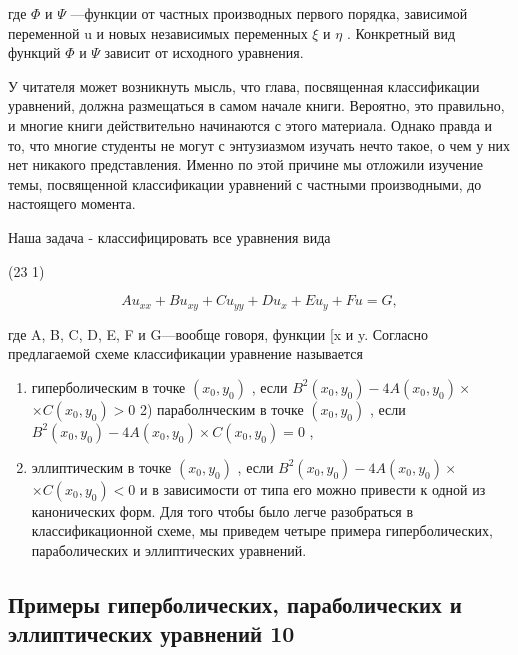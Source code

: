 \documentclass[
  ukrainian,
]{article}
\begin{document}
где \(\Phi\) и \(\Psi\) ---функции от частных производных первого
порядка, зависимой переменной u и новых независимых переменных \(\xi\) и
\(\eta\) . Конкретный вид функций \(\Phi\) и \(\Psi\) зависит от
исходного уравнения.

У читателя может возникнуть мысль, что глава, посвященная классификации
уравнений, должна размещаться в самом начале книги. Вероятно, это
правильно, и многие книги действительно начинаются с этого материала.
Однако правда и то, что многие студенты не могут с энтузиазмом изучать
нечто такое, о чем у них нет никакого представления. Именно по этой
причине мы отложили изучение темы, посвященной классификации уравнений с
частными производными, до настоящего момента.

Наша задача - классифицировать все уравнения вида

(23 1)

\[
Au_{xx} + Bu_{xy} + Cu_{yy} + Du_x + Eu_y + Fu = G,
\]

где A, B, C, D, E, F и G---вообще говоря, функции {[}x и y. Согласно
предлагаемой схеме классификации уравнение называется

\begin{enumerate}
\def\labelenumi{\arabic{enumi})}
\item
  гиперболическим в точке \((x_0, y_0)\) , если
  \(B^2(x_0, y_0) - 4A(x_0, y_0) \times\) \(\times C(x_0, y_0) > 0\) 2)
  параболнческим в точке \((x_0, y_0)\) , если
  \(B^2(x_0, y_0) - 4A(x_0, y_0) \times C(x_0, y_0) = 0\) ,
\item
  эллиптическим в точке \((x_0, y_0)\) , если
  \(B^2(x_0, y_0) - 4A(x_0, y_0) \times\) \(\times C(x_0, y_0) < 0\) и в
  зависимости от типа его можно привести к одной из канонических форм.
  Для того чтобы было легче разобраться в классификационной схеме, мы
  приведем четыре примера гиперболических, параболических и
  эллиптических уравнений.
\end{enumerate}

\subsection{Примеры гиперболических, параболических и эллиптических
уравнений
10}\label{ux43fux440ux438ux43cux435ux440ux44b-ux433ux438ux43fux435ux440ux431ux43eux43bux438ux447ux435ux441ux43aux438ux445-ux43fux430ux440ux430ux431ux43eux43bux438ux447ux435ux441ux43aux438ux445-ux438-ux44dux43bux43bux438ux43fux442ux438ux447ux435ux441ux43aux438ux445-ux443ux440ux430ux432ux43dux435ux43dux438ux439-10}
\end{document}
